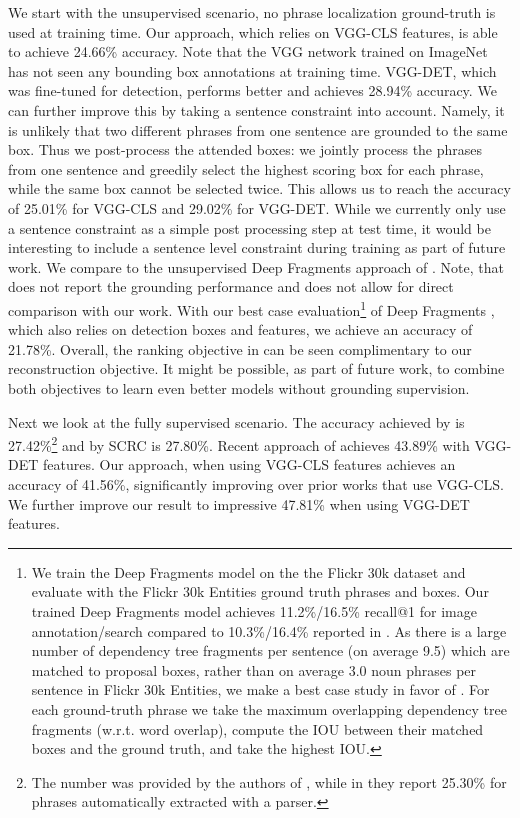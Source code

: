 We start with the unsupervised scenario, \ie no phrase localization ground-truth is used at training time.
Our approach, which relies on VGG-CLS features, is able to achieve 24.66\% accuracy. Note that the VGG network trained on ImageNet has not seen any bounding box annotations at training time. VGG-DET, which was fine-tuned for detection, performs better and achieves 28.94\% accuracy. We can further improve this by taking a sentence constraint  into account. Namely, it is unlikely that two different phrases from one sentence are grounded to the same box. Thus we post-process the attended boxes: we jointly process the phrases from one sentence and greedily select the highest scoring box for each phrase, while the same box cannot be selected twice. This allows us to reach the accuracy of 25.01\% for VGG-CLS and 29.02\% for VGG-DET. While we currently only use a sentence constraint as a simple post processing step at test time, it would be interesting to include a sentence level constraint during training as part of future work. 
We compare to the unsupervised Deep Fragments approach of \cite{karpathy14nips}. 
Note, that \cite{karpathy14nips} does
not report the grounding performance and does not allow for direct comparison with our work. With our best case evaluation\footnote{We train the Deep Fragments model \cite{karpathy14nips} on the the Flickr 30k dataset and evaluate with the Flickr 30k Entities ground truth phrases and boxes. Our trained Deep Fragments model achieves 11.2\%/16.5\% recall@1 for image annotation/search compared to 10.3\%/16.4\% reported in \cite{karpathy14nips}. As there is a large number of dependency tree fragments per sentence (on average 9.5) which are matched to proposal boxes, rather than on average 3.0 noun phrases per sentence in Flickr 30k Entities, we make a best case study in favor of \cite{karpathy14nips}. For each ground-truth phrase we take the maximum overlapping dependency tree fragments (w.r.t. word overlap), compute the IOU between their matched boxes and the ground truth, and take the highest IOU.}
of Deep Fragments \cite{karpathy14nips}, which also relies on detection boxes and features, we achieve an accuracy of 21.78\%. 
Overall, the ranking objective in \cite{karpathy14nips} can be seen complimentary to our reconstruction objective. It might be possible, as part of future work, to combine both objectives to learn even better models without grounding supervision.

Next we look at the fully supervised scenario. The accuracy achieved by \cite{plummer15iccv} is 27.42\%\footnote{The number was provided by the authors of \cite{plummer15iccv}, while in \cite{plummer15iccv} they report 25.30\% for phrases automatically extracted with a parser.} and by  
SCRC \cite{hu16cvpr} is 27.80\%. Recent approach of \cite{wang2016cvpr} achieves 43.89\% with VGG-DET features. Our approach, when using VGG-CLS features achieves an accuracy of 41.56\%, significantly improving over prior works that use VGG-CLS. We further improve our result to impressive 47.81\% when using VGG-DET features.

